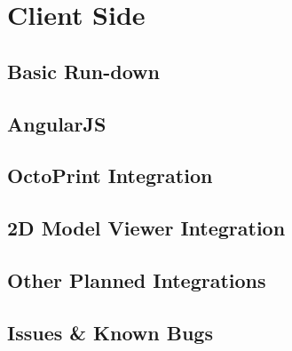 \chapter{Client Side}
\section{Basic Run-down}
\section{AngularJS}
\section{OctoPrint Integration}
\section{2D Model Viewer Integration}
\section{Other Planned Integrations}
\section{Issues & Known Bugs}


